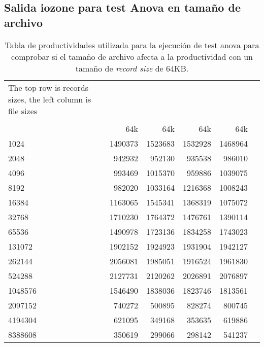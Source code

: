 \subsection{Salida iozone para test Anova en tamaño de archivo}
\begin{table}[H]\centering
\caption{Tabla de productividades utilizada para la ejecución de test anova para comprobar si el tamaño de archivo afecta a la productividad con un tamaño de \textit{record size} de 64KB.}\label{tab:tabla_salida_anova_archivo}
\scriptsize
\begin{tabular}{lrrrrr}\toprule
The top row is records sizes, the left column is file sizes & & & & \\
& & & & \\
&64k &64k &64k &64k \\\midrule
1024 &1490373 &1523683 &1532928 &1468964 \\
2048 &942932 &952130 &935538 &986010 \\
4096 &993469 &1015370 &959886 &1039075 \\
8192 &982020 &1033164 &1216368 &1008243 \\
16384 &1163065 &1545341 &1368319 &1075072 \\
32768 &1710230 &1764372 &1476761 &1390114 \\
65536 &1490978 &1723136 &1834258 &1743023 \\
131072 &1902152 &1924923 &1931904 &1942127 \\
262144 &2056081 &1985051 &1916524 &1961830 \\
524288 &2127731 &2120262 &2026891 &2076897 \\
1048576 &1546490 &1838036 &1823746 &1813561 \\
2097152 &740272 &500895 &828274 &800745 \\
4194304 &621095 &349168 &353635 &619886 \\
8388608 &350619 &299066 &298142 &541237 \\
\bottomrule
\end{tabular}
\end{table}

